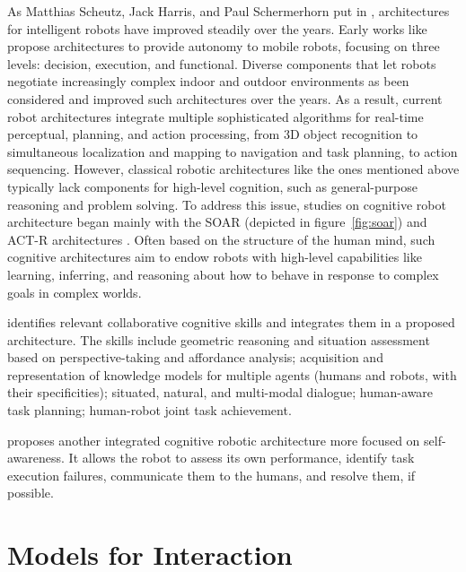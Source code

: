 As Matthias Scheutz, Jack Harris, and Paul Schermerhorn put in \cite{scheutz_systematic_2013}, architectures for intelligent robots have improved steadily over the years. 
Early works like \cite{alami_designing_1993,alami_architecture_1998,chatila_integrated_1992} propose architectures to provide autonomy to mobile robots, focusing on three levels: decision, execution, and functional. Diverse components that let robots negotiate increasingly complex indoor and outdoor environments as been considered and improved such architectures over the years. As a result, current robot architectures integrate multiple sophisticated algorithms for real-time perceptual, planning, and action processing, from 3D object recognition to simultaneous localization and mapping to navigation and task planning, to action sequencing. However, classical robotic architectures like the ones mentioned above typically lack components for high-level cognition, such as general-purpose reasoning and problem solving. 
To address this issue, studies on cognitive robot architecture began mainly with the SOAR (depicted in figure~\ref{fig:soar}) and ACT-R architectures \cite{laird_soar_1987,anderson2004integrated}.
Often based on the structure of the human mind, such cognitive architectures aim to endow robots with high-level capabilities like learning, inferring, and reasoning about how to behave in response to complex goals in complex worlds. 

\cite{lemaignan_artificial_2017} identifies relevant collaborative cognitive skills and integrates them in a proposed architecture. The skills include geometric reasoning and situation assessment based on perspective-taking and affordance analysis; acquisition and representation of knowledge models for multiple agents (humans and robots, with their specificities); situated, natural, and multi-modal dialogue; human-aware task planning; human-robot joint task achievement.

\cite{thierauf_toward_2024} proposes another integrated cognitive robotic architecture more focused on self-awareness. It allows the robot to assess its own performance, identify task execution failures, communicate them to the humans, and resolve them, if possible. 



\section{Models for Interaction}


